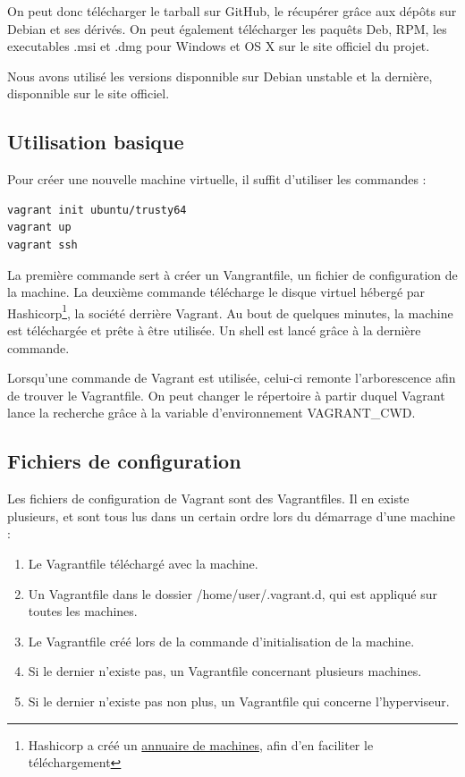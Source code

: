 \documentclass[12pt,a4paper]{article}
\begin{document}
On peut donc télécharger le tarball sur GitHub, le récupérer grâce aux dépôts sur Debian et ses dérivés. On peut également télécharger les paquêts Deb, RPM, les executables .msi et .dmg pour Windows et OS X sur le site officiel du projet.

Nous avons utilisé les versions disponnible sur Debian unstable et la dernière, disponnible sur le site officiel.

\subsection{Utilisation basique}

Pour créer une nouvelle machine virtuelle, il suffit d'utiliser les commandes :
\begin{lstlisting}
vagrant init ubuntu/trusty64
vagrant up
vagrant ssh
\end{lstlisting}

La première commande sert à créer un Vangrantfile, un fichier de configuration de la machine. La deuxième commande télécharge le disque virtuel hébergé par Hashicorp\footnote{Hashicorp a créé un \href{https://atlas.hashicorp.com/boxes/search}{annuaire de machines}, afin d'en faciliter le téléchargement}, la société derrière Vagrant.
Au bout de quelques minutes, la machine est téléchargée et prête à être utilisée. Un shell est lancé grâce à la dernière commande. 

Lorsqu'une commande de Vagrant est utilisée, celui-ci remonte l'arborescence afin de trouver le Vagrantfile. On peut changer le répertoire à partir duquel Vagrant lance la recherche grâce à la variable d'environnement VAGRANT\_CWD. 

\subsection{Fichiers de configuration}
Les fichiers de configuration de Vagrant sont des Vagrantfiles. Il en existe plusieurs, et sont tous lus dans un certain ordre lors du démarrage d'une machine :
\begin{enumerate}
	\item{Le Vagrantfile téléchargé avec la machine.}
	\item{Un Vagrantfile dans le dossier /home/user/.vagrant.d, qui est appliqué sur toutes les machines.}
	\item{Le Vagrantfile créé lors de la commande d'initialisation de la machine.}
	\item{Si le dernier n'existe pas, un Vagrantfile concernant plusieurs machines.}
	\item{Si le dernier n'existe pas non plus, un Vagrantfile qui concerne l'hyperviseur.}
\end{enumerate}
\end{document}
